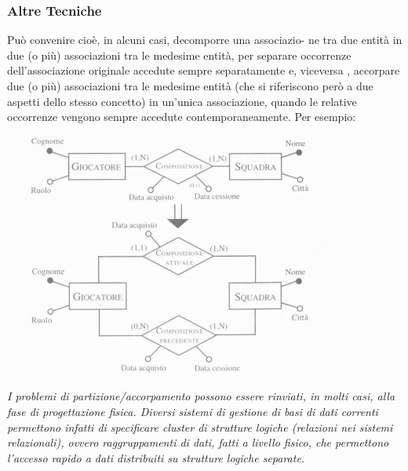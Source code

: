 \documentclass[a4paper,12pt, oneside]{book}
\begin{document}
\subsubsection{Altre Tecniche}
Può convenire cioè, in alcuni casi, decomporre una associazio-
ne tra due entità in due (o più) associazioni tra le medesime entità, per separare
occorrenze dell'associazione originale accedute sempre separatamente e, viceversa
, accorpare due (o più) associazioni tra le medesime entità (che si riferiscono
però a due aspetti dello stesso concetto) in un'unica associazione, quando le
relative occorrenze vengono sempre accedute contemporaneamente. Per esempio:
\begin{center}
\includegraphics[scale=1]{img/conc4.png}
\end{center}
\textit{I problemi di partizione/accorpamento possono essere rinviati, in molti casi, alla
fase di progettazione fisica. Diversi sistemi di gestione di basi di dati correnti
permettono infatti di specificare cluster di strutture logiche (relazioni nei sistemi
relazionali), ovvero raggruppamenti di dati, fatti a livello fisico, che permettono
l'accesso rapido a dati distribuiti su strutture logiche separate.}
\end{document}
